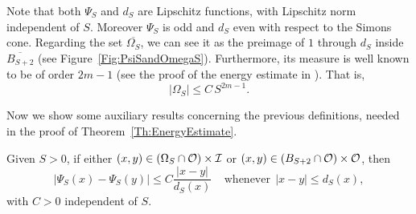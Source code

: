 Note that both $\Psi_S$ and $d_S$ are Lipschitz functions, with Lipschitz norm independent of $S$. Moreover $\Psi_S$ is odd and $d_S$ even with respect to the Simons cone. Regarding the set $\overline{\Omega_S}$, we can see it as the preimage of $1$ through $d_S$ inside $\overline{B_{S+2}}$ (see Figure~\ref{Fig:PsiSandOmegaS}). Furthermore, its measure is well known to be of order $2m-1$ (see the proof of the energy estimate in \cite{CabreTerraI}). That is,
\begin{equation}
\label{Eq:MeasureOmegaS}
|\Omega_S| \leq C\,S^{2m-1}.
\end{equation}


Now we show some auxiliary results concerning the previous definitions, needed in the proof of Theorem~\ref{Th:EnergyEstimate}.

\begin{lemma}
\label{Lemma: AdaptedLipschitzConditionWith_dFunction}
Given $S>0$, if either $(x,y) \in \left(\Omega_S\cap \mathcal{O}\right) \times \mathcal{I}$ or $(x,y)\in \left(B_{S+2}\cap \mathcal{O}\right) \times \mathcal{O}$, then
$$ |\Psi_S(x) - \Psi_S(y)| \leq C \frac{|x-y|}{d_S(x)} \ \ \ \ \ \textrm{whenever} \ \ |x-y|\leq d_S(x), $$
with $C>0$ independent of $S$.
\end{lemma}

